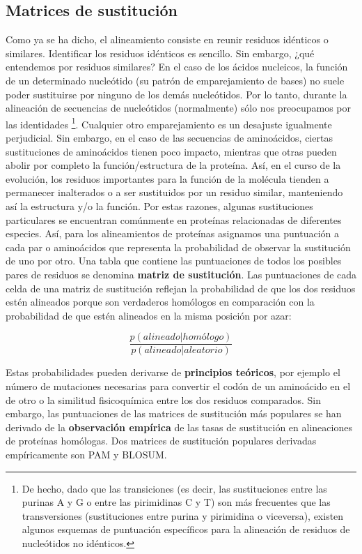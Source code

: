 \subsection{Matrices de sustitución}
Como ya se ha dicho, el alineamiento consiste en reunir residuos idénticos o similares. Identificar los residuos idénticos es sencillo. Sin embargo, ¿qué entendemos por residuos similares? En el caso de los ácidos nucleicos, la función de un determinado nucleótido (su patrón de emparejamiento de bases) no suele poder sustituirse por ninguno de los demás nucleótidos. Por lo tanto, durante la alineación de secuencias de nucleótidos (normalmente) sólo nos preocupamos por las identidades \footnote{De hecho, dado que las transiciones (es decir, las sustituciones entre las purinas A y G o entre las pirimidinas C y T) son más frecuentes que las transversiones (sustituciones entre purina y pirimidina o viceversa), existen algunos esquemas de puntuación específicos para la alineación de residuos de nucleótidos no idénticos.}. Cualquier otro emparejamiento es un desajuste igualmente perjudicial. Sin embargo, en el caso de las secuencias de aminoácidos, ciertas sustituciones de aminoácidos tienen poco impacto, mientras que otras pueden abolir por completo la función/estructura de la proteína. Así, en el curso de la evolución, los residuos importantes para la función de la molécula tienden a permanecer inalterados o a ser sustituidos por un residuo similar, manteniendo así la estructura y/o la función. Por estas razones, algunas sustituciones particulares se encuentran comúnmente en proteínas relacionadas de diferentes especies. Así, para los alineamientos de proteínas asignamos una puntuación a cada par o aminoácidos que representa la probabilidad de observar la sustitución de uno por otro. Una tabla que contiene las puntuaciones de todos los posibles pares de residuos se denomina \textbf{matriz de sustitución}. Las puntuaciones de cada celda de una matriz de sustitución reflejan la probabilidad de que los dos residuos estén alineados porque son verdaderos homólogos en comparación con la probabilidad de que estén alineados en la misma posición por azar:

$$\frac{p(alineado|homólogo)}{p(alineado|aleatorio)}$$

Estas probabilidades pueden derivarse de \textbf{principios teóricos}, por ejemplo el número de mutaciones necesarias para convertir el codón de un aminoácido en el de otro o la similitud fisicoquímica entre los dos residuos comparados. Sin embargo, las puntuaciones de las matrices de sustitución más populares se han derivado de la \textbf{observación empírica} de las tasas de sustitución en alineaciones de proteínas homólogas. Dos matrices de sustitución populares derivadas empíricamente son PAM y BLOSUM.

